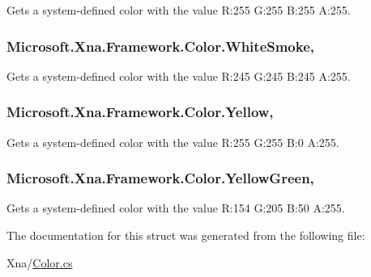 Gets a system-\/defined color with the value R\+:255 G\+:255 B\+:255 A\+:255.

\hypertarget{struct_microsoft_1_1_xna_1_1_framework_1_1_color_a33c7dafb52654e1343b222a5b588961e}{}
\subsubsection[{White\+Smoke}]{ Microsoft.\+Xna.\+Framework.\+Color.\+White\+Smoke\hspace{0.3cm}{\ttfamily [static]}, {\ttfamily [get]}}\label{struct_microsoft_1_1_xna_1_1_framework_1_1_color_a33c7dafb52654e1343b222a5b588961e}


Gets a system-\/defined color with the value R\+:245 G\+:245 B\+:245 A\+:255.

\hypertarget{struct_microsoft_1_1_xna_1_1_framework_1_1_color_a3db519f31499708443925dfff3b47793}{}
\subsubsection[{Yellow}]{ Microsoft.\+Xna.\+Framework.\+Color.\+Yellow\hspace{0.3cm}{\ttfamily [static]}, {\ttfamily [get]}}\label{struct_microsoft_1_1_xna_1_1_framework_1_1_color_a3db519f31499708443925dfff3b47793}


Gets a system-\/defined color with the value R\+:255 G\+:255 B\+:0 A\+:255.

\hypertarget{struct_microsoft_1_1_xna_1_1_framework_1_1_color_aa03e8570d5fb0b256e8471f08adc79af}{}
\subsubsection[{Yellow\+Green}]{ Microsoft.\+Xna.\+Framework.\+Color.\+Yellow\+Green\hspace{0.3cm}{\ttfamily [static]}, {\ttfamily [get]}}\label{struct_microsoft_1_1_xna_1_1_framework_1_1_color_aa03e8570d5fb0b256e8471f08adc79af}


Gets a system-\/defined color with the value R\+:154 G\+:205 B\+:50 A\+:255.



The documentation for this struct was generated from the following file\+:\begin{DoxyCompactItemize}
\item 
Xna/\hyperlink{_color_8cs}{Color.\+cs}\end{DoxyCompactItemize}
